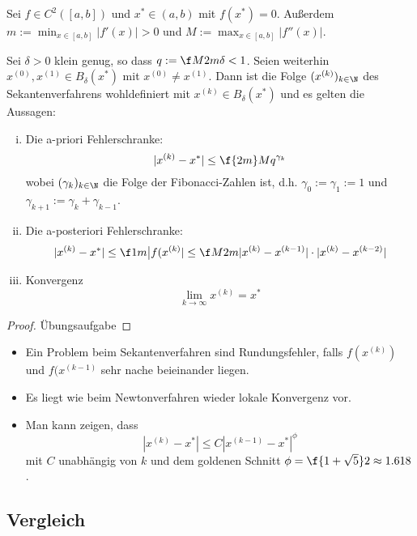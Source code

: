 \documentclass[11pt]{scrbook}
\begin{document}
\begin{st} \label{3.6}
	Sei $f\in C^2([a,b])$ und $x^* \in (a,b)$ mit $f(x^*) = 0$.
	Außerdem $m := \min_{x \in [a,b]}|f'(x)| > 0$ und $M := \max_{x\in[a,b]}|f''(x)|$.

	Sei $\delta > 0$ klein genug, so dass $q := \f M{2m} \delta < 1$.
	Seien weiterhin $x^{(0)}, x^{(1)} \in B_\delta(x^*)$ mit $x^{(0)} \neq x^{(1)}$.
	Dann ist die Folge $(x^{(k)})_{k \in \N}$ des Sekantenverfahrens wohldefiniert mit $x^{(k)} \in B_\delta(x^*)$ und es gelten die Aussagen:
	\begin{enumerate}[i)]
		\item
			Die a-priori Fehlerschranke:
			\[
				|x^{(k)} -x^*| \le \f {2m}M q^{\gamma_k}
			\]
			wobei $(\gamma_k)_{k\in \N}$ die Folge der Fibonacci-Zahlen ist, d.h. $\gamma_0 := \gamma_1 := 1$ und $\gamma_{k+1} := \gamma_k + \gamma_{k-1}$.
		\item
			Die a-posteriori Fehlerschranke:
			\[
				|x^{(k)}-x^*| \le \f 1m \big| f(x^{(k)} | \le \f M{2m} |x^{(k)} - x^{(k-1)}| \cdot |x^{(k)}-x^{(k-2)}|
			\]
		\item
			Konvergenz
			\[
				\lim_{k \to \infty} x^{(k)} = x^*
			\]
	\end{enumerate}
	\begin{proof}
		Übungsaufgabe
	\end{proof}
	\begin{note}
		\begin{itemize}
			\item
				Ein Problem beim Sekantenverfahren sind Rundungsfehler, falls $f(x^{(k)})$ und $f(x^{(k-1)}$ sehr nache beieinander liegen.
			\item
				Es liegt wie beim Newtonverfahren wieder lokale Konvergenz vor.
			\item
				Man kann zeigen, dass
				\[
					|x^{(k)} - x^*| \le C |x^{(k-1)} - x^*|^\phi
				\]
				mit $C$ unabhängig von $k$ und dem goldenen Schnitt $\phi = \f {1+\sqrt 5}2 \approx 1.618$.
		\end{itemize}
	\end{note}
\end{st}

\subsection{Vergleich}
\end{document}
